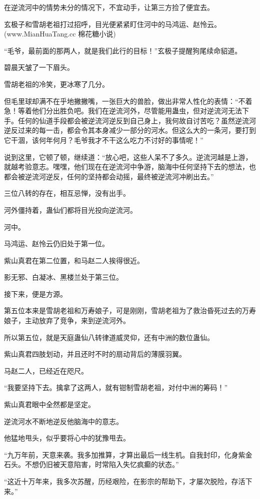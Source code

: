 \begin{this_body}
在逆流河中的情势未分的情况下，不宜动手，让第三方捡了便宜去。

玄极子和雪胡老祖打过招呼，目光便紧紧盯住河中的马鸿运、赵怜云。(www.MianHuaTang.cc 棉花糖小说)

“毛爷，最前面的那两人，就是我们此行的目标！”玄极子提醒狗尾续命貂道。

碧晨天皱了一下眉头。

雪胡老祖的冷笑，更冰寒了几分。

但毛里球却满不在乎地撇撇嘴，一张巨大的兽脸，做出非常人性化的表情：“不着急！等着他们分出胜负吧。我们在逆流河外，尽管能用蛊虫，但对逆流河无法下手。任何的仙道手段都会被逆流河逆反到自己身上，我何故自讨苦吃？虽然逆流河逆反过来的每一击，都会令其本身减少一部分的河水。但这么大的一条河，要打到它干涸，该何年何月？毛爷我才不干这么吃力不讨好的事情呢！”

说到这里，它顿了顿，继续道：“放心吧，这些人呆不了多久。逆流河越是上游，就越考验意志。嘿嘿，他们现在在逆流河中争游，脑海中任何坚持下去的想法，也都会被逆流河逆反，任何的坚持都会动摇，最终被逆流河冲刷出去。”

三位八转的存在，相互忌惮，没有出手。

河外僵持着，蛊仙们都将目光投向逆流河。

河中。

马鸿运、赵怜云仍旧处于第一位。

紫山真君在第二位置，和马赵二人挨得很近。

影无邪、白凝冰、黑楼兰处于第三位。

接下来，便是方源。

第五位本来是雪胡老祖和万寿娘子，可是刚刚，雪胡老祖为了救治昏死过去的万寿娘子，主动放弃了竞争，来到逆流河外。

所以第五位，就是天庭蛊仙八转律道威灵仰，还有中洲的数位蛊仙。

紫山真君四肢划动，并且还时不时的扇动背后的薄膜羽翼。

马赵二人，已经近在咫尺。

“我要坚持下去。擒拿了这两人，就有钳制雪胡老祖，对付中洲的筹码！”

紫山真君眼中全然都是坚定。

逆流河水不断地逆反他脑海中的意志。

他猛地甩头，似乎要将心中的犹豫甩去。

“九万年前，天意来袭。我多加推算，才算出最后一线生机。自我封印，化身紫金石头。不想仍旧被天意陷害，时常陷入失忆疯癫的状态。”

“这近十万年来，我多次苏醒，历经艰险，在影宗的帮助下，才屡次脱险，存活下来。”


\end{this_body}
